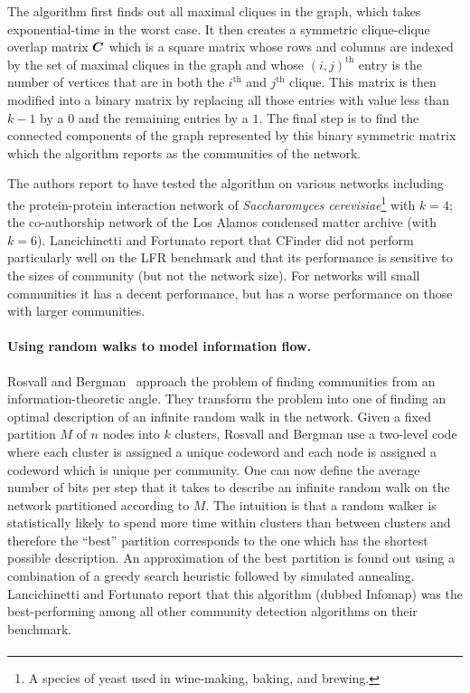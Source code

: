 The algorithm first finds out all maximal cliques in the graph, which takes exponential-time
in the worst case. It then creates a symmetric clique-clique overlap matrix $\boldsymbol{C}$ which is a square matrix whose 
rows and columns are indexed by the set of maximal cliques in the graph and whose $(i, j)^{\mathrm{th}}$ entry
is the number of vertices that are in both the $i^{\mathrm{th}}$ and $j^{\mathrm{th}}$ clique. This matrix is then modified into 
a binary matrix by replacing all those entries with value less than $k - 1$ by a $0$ and the remaining entries by 
a $1$. The final step is to find the connected components of the graph represented by this binary symmetric matrix
which the algorithm reports as the communities of the network. 

The authors report to have tested the algorithm on various networks including the protein-protein interaction 
network of \emph{Saccharomyces cerevisiae}\footnote{A species of yeast used in wine-making, baking, and brewing.} 
with $k = 4$; the co-authorship network of the Los Alamos condensed matter archive (with $k = 6$). 
Lancichinetti and Fortunato report that CFinder did not perform particularly well on the LFR benchmark and 
that its performance is sensitive to the sizes of community (but not the network size). For networks will 
small communities it has a decent performance, but has a worse performance on those with larger communities. 

\paragraph{Using random walks to model information flow.} Rosvall and Bergman~\cite{RB08} approach the 
problem of finding communities from an information-theoretic angle. They transform the problem 
into one of finding an optimal description of an infinite random walk in the network.  Given a fixed 
partition $M$ of $n$ nodes into $k$ clusters, Rosvall and Bergman use a two-level code where each 
cluster is assigned a unique codeword and each node is assigned a codeword which is unique per community.
One can now define the average number of bits per step that it 
takes to describe an infinite random walk on the network partitioned according to $M$. The intuition 
is that a random walker is statistically likely to spend more time within clusters than between clusters
and therefore the ``best'' partition corresponds to the one which has the shortest possible description.
An approximation of the best partition is found out using a combination of a greedy search heuristic followed by simulated 
annealing. Lancichinetti and Fortunato report that this algorithm (dubbed Infomap) was the best-performing 
among all other community detection algorithms on their benchmark.  

\paragraph{}
